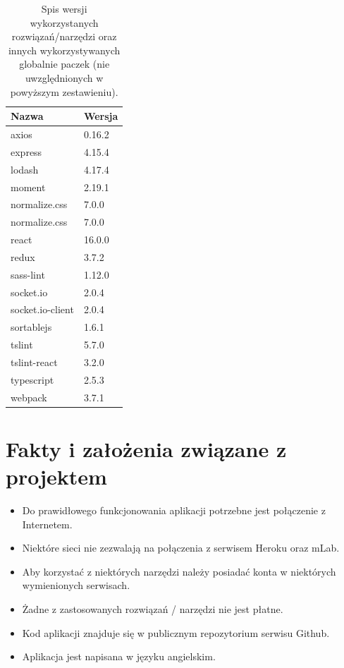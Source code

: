 \documentclass[eng,printmode]{mgr}
\begin{document}
\begin{table}[H]
\begin{tabularx}{\textwidth}{|X|X|}
   \hline
    \textbf{Nazwa} & \textbf{Wersja} \\
   \hline
      axios & 0.16.2 \\
   \hline
     express & 4.15.4 \\
   \hline
  	  lodash & 4.17.4 \\
   \hline
   	  moment & 2.19.1 \\
   \hline
   	 normalize.css & 7.0.0 \\
   \hline
   	 normalize.css & 7.0.0 \\
   \hline
   	 react & 16.0.0 \\
   \hline
   	 redux & 3.7.2 \\
   \hline
   	 sass-lint & 1.12.0 \\
   \hline
   	 socket.io & 2.0.4 \\
   \hline
   	  socket.io-client  & 2.0.4 \\
   \hline
      sortablejs & 1.6.1 \\
   \hline
     tslint & 5.7.0 \\
   \hline
      tslint-react & 3.2.0 \\
   \hline
      typescript & 2.5.3 \\
   \hline
     webpack & 3.7.1 \\
   \hline
\end{tabularx}
\caption{Spis wersji wykorzystanych rozwiązań/narzędzi oraz innych wykorzystywanych globalnie paczek (nie uwzględnionych w powyższym zestawieniu).}
\end{table}

\section{Fakty i założenia związane z projektem }
\begin{itemize}
  \item Do prawidłowego funkcjonowania aplikacji potrzebne jest połączenie z Internetem.
  \item Niektóre sieci nie zezwalają na połączenia z serwisem Heroku oraz mLab.
  \item Aby korzystać z niektórych narzędzi należy posiadać konta w niektórych wymienionych serwisach.
  \item Żadne z zastosowanych rozwiązań / narzędzi nie jest płatne.
  \item Kod aplikacji znajduje się w publicznym repozytorium serwisu Github.
  \item Aplikacja jest napisana w języku angielskim.
\end{itemize}
\end{document}
